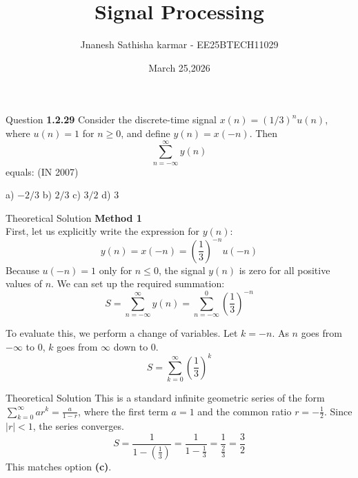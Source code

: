 \documentclass{beamer}
\title %
{Signal Processing}
\date{March 25,2026}
\author 
{Jnanesh Sathisha karmar - EE25BTECH11029}
\begin{document}
\frame{\titlepage}
\begin{frame}{Question}
\noindent
\textbf{1.2.29} \quad
Consider the discrete-time signal $x(n) = (1/3)^n u(n)$, where $u(n) = 1$ for $n \geq 0$, and define $y(n) = x(-n)$. Then 
\[
\sum_{n=-\infty}^{\infty} y(n)
\]
equals: \hfill (IN 2007)

\vspace{0.5cm}

\noindent
a) $-2/3$ \hspace{2cm}
b) $2/3$ \hspace{2cm}
c) $3/2$ \hspace{2cm}
d) $3$

\end{frame}

\begin{frame}{Theoretical Solution}
\textbf{Method 1}\\
First, let us explicitly write the expression for $y(n)$:
\begin{equation}
y(n) = x(-n) = \left(\frac{1}{3}\right)^{-n} u(-n)
\end{equation}
Because $u(-n) = 1$ only for $n \le 0$, the signal $y(n)$ is zero for all positive values of $n$. We can set up the required summation:
\begin{equation}
S = \sum_{n=-\infty}^{\infty} y(n) = \sum_{n=-\infty}^{0} \left(\frac{1}{3}\right)^{-n}
\end{equation}

To evaluate this, we perform a change of variables. Let $k = -n$. As $n$ goes from $-\infty$ to $0$, $k$ goes from $\infty$ down to $0$.
\begin{equation}
S = \sum_{k=0}^{\infty} \left(\frac{1}{3}\right)^{k}
\end{equation}

\end{frame}

\begin{frame}{Theoretical Solution}
This is a standard infinite geometric series of the form $\sum_{k=0}^{\infty} a r^k = \frac{a}{1 - r}$, where the first term $a = 1$ and the common ratio $r = -\frac{1}{2}$. Since $|r| < 1$, the series converges.
\begin{equation}
S = \frac{1}{1 - \left(\frac{1}{3}\right)} = \frac{1}{1 - \frac{1}{3}} = \frac{1}{\frac{2}{3}} = \frac{3}{2}
\end{equation}
This matches option \textbf{(c)}.
\end{frame}
\end{document}
